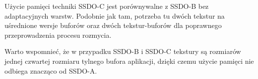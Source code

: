 		Użycie pamięci techniki SSDO-C jest porównywalne z SSDO-B bez adaptacyjnych warstw. Podobnie jak tam, potrzeba tu dwóch tekstur na uśrednione wersje buforów oraz dwóch tekstur-buforów dla poprawnego przeprowadzenia procesu rozmycia. 
		
		Warto wspomnieć, że w przypadku SSDO-B i SSDO-C tekstury są rozmiarów jednej czwartej rozmiaru tylnego bufora aplikacji, dzięki czemu użycie pamięci nie odbiega znacząco od SSDO-A.
		